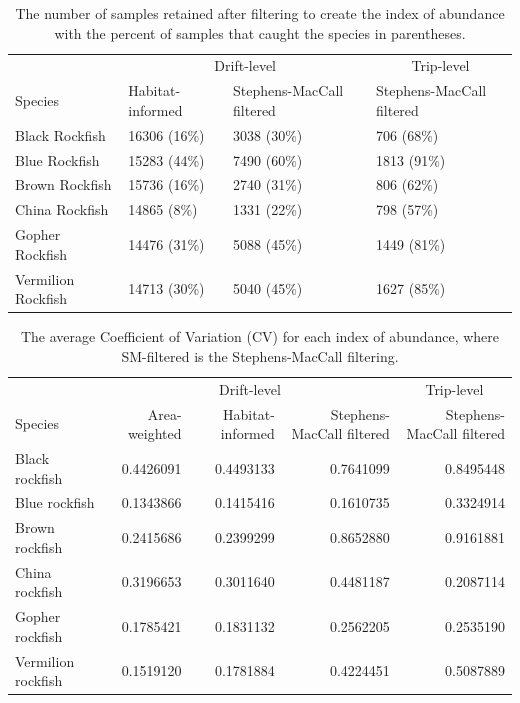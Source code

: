 \documentclass[
  12pt,
  authoryear,
  preprint,
  3p]{elsarticle}
\begin{document}
\FloatBarrier

\hypertarget{tbl-samplesize}{}
\begin{longtable}[t]{>{\raggedright\arraybackslash}p{1.6in}lll}
\caption{\label{tbl-samplesize}The number of samples retained after filtering to create the index of
abundance with the percent of samples that caught the species in
parentheses. }\tabularnewline

\toprule
\multicolumn{1}{c}{ } & \multicolumn{2}{c}{Drift-level} & \multicolumn{1}{c}{Trip-level} \\
\cmidrule(l{3pt}r{3pt}){2-3} \cmidrule(l{3pt}r{3pt}){4-4}
Species & Habitat-informed & Stephens-MacCall filtered & Stephens-MacCall filtered\\
\midrule
Black Rockfish & 16306 (16\%) & 3038 (30\%) & 706 (68\%)\\
Blue Rockfish & 15283 (44\%) & 7490 (60\%) & 1813 (91\%)\\
Brown Rockfish & 15736 (16\%) & 2740 (31\%) & 806 (62\%)\\
China Rockfish & 14865 (8\%) & 1331 (22\%) & 798 (57\%)\\
Gopher Rockfish & 14476 (31\%) & 5088 (45\%) & 1449 (81\%)\\
\addlinespace
Vermilion Rockfish & 14713 (30\%) & 5040 (45\%) & 1627 (85\%)\\
\bottomrule
\end{longtable}

\FloatBarrier

\hypertarget{tbl-avgcv}{}
\begin{longtable}[t]{lrrrr}
\caption{\label{tbl-avgcv}The average Coefficient of Variation (CV) for each index of abundance,
where SM-filtered is the Stephens-MacCall filtering. }\tabularnewline

\toprule
\multicolumn{1}{c}{ } & \multicolumn{3}{c}{Drift-level} & \multicolumn{1}{c}{Trip-level} \\
\cmidrule(l{3pt}r{3pt}){2-4} \cmidrule(l{3pt}r{3pt}){5-5}
Species & Area-weighted & Habitat-informed & Stephens-MacCall filtered & Stephens-MacCall filtered\\
\midrule
Black rockfish & 0.4426091 & 0.4493133 & 0.7641099 & 0.8495448\\
Blue rockfish & 0.1343866 & 0.1415416 & 0.1610735 & 0.3324914\\
Brown rockfish & 0.2415686 & 0.2399299 & 0.8652880 & 0.9161881\\
China rockfish & 0.3196653 & 0.3011640 & 0.4481187 & 0.2087114\\
Gopher rockfish & 0.1785421 & 0.1831132 & 0.2562205 & 0.2535190\\
\addlinespace
Vermilion rockfish & 0.1519120 & 0.1781884 & 0.4224451 & 0.5087889\\
\bottomrule
\end{longtable}
\end{document}
